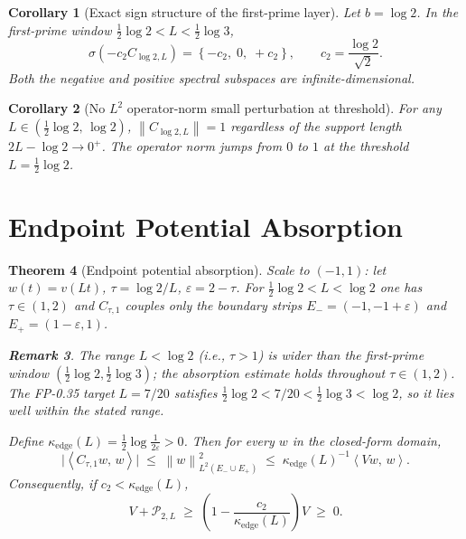 \documentclass[12pt,a4paper]{amsart}
\theoremstyle{plain}
\newtheorem{theorem}{Theorem}[section]
\newtheorem{corollary}[theorem]{Corollary}
\theoremstyle{definition}
\newtheorem{remark}[theorem]{Remark}
\newcommand{\Ctau}{C_{\tau,1}}
\newcommand{\ctwo}{c_2}              %
\newcommand{\kappae}{\kappa_{\mathrm{edge}}}
\newcommand{\Eminus}{E_-}
\newcommand{\Eplus}{E_+}
\newcommand{\norm}[1]{\left\|#1\right\|}
\newcommand{\ip}[2]{\left\langle #1,\, #2\right\rangle}
\begin{document}
\begin{corollary}[Exact sign structure of the first-prime layer]
\label{cor:first-prime}
Let $b = \log 2$.
In the first-prime window $\tfrac{1}{2}\log 2 < L < \tfrac{1}{2}\log 3$,
\[
  \sigma\!\left(-\ctwo C_{\log 2,L}\right)
  = \left\{-\ctwo,\; 0,\; +\ctwo\right\},
  \qquad \ctwo = \frac{\log 2}{\sqrt 2}.
\]
Both the negative and positive spectral subspaces are infinite-dimensional.
\end{corollary}

\begin{corollary}[No $L^2$ operator-norm small perturbation at threshold]
\label{thm:no-small-pert}
For any $L \in (\tfrac{1}{2}\log 2,\, \log 2)$,
$\norm{C_{\log 2,L}} = 1$
regardless of the support length $2L - \log 2 \to 0^+$.
The operator norm jumps from $0$ to $1$ at the threshold
$L = \tfrac{1}{2}\log 2$.
\end{corollary}

\section{Endpoint Potential Absorption}
\label{sec:absorption}

\begin{theorem}[Endpoint potential absorption]
\label{thm:absorption}
Scale to $(-1,1)$: let $w(t) = v(Lt)$, $\tau = \log 2/L$,
$\varepsilon = 2 - \tau$.
For $\tfrac{1}{2}\log 2 < L < \log 2$ one has $\tau \in (1,2)$ and
$\Ctau$ couples only the boundary strips
$\Eminus = (-1,-1+\varepsilon)$ and $\Eplus = (1-\varepsilon,1)$.
\begin{remark}
The range $L < \log 2$ (i.e., $\tau > 1$) is wider than the first-prime
window $(\tfrac12\log 2, \tfrac12\log 3)$; the absorption estimate holds
throughout $\tau\in(1,2)$. The FP-0.35 target $L = 7/20$ satisfies
$\tfrac12\log 2 < 7/20 < \tfrac12\log 3 < \log 2$, so it lies well within
the stated range.
\end{remark}
Define $\kappae(L) = \tfrac{1}{2}\log\!\tfrac{1}{2\varepsilon} > 0$.
Then for every $w$ in the closed-form domain,
\begin{equation}\label{eq:absorption}
  \bigl|\ip{\Ctau w}{w}\bigr|
  \;\le\; \norm{w}_{L^2(\Eminus \cup \Eplus)}^2
  \;\le\; \kappae(L)^{-1}\ip{Vw}{w}.
\end{equation}
Consequently, if $\ctwo < \kappae(L)$,
\[
  V + \mathcal{P}_{2,L}
  \;\ge\; \left(1 - \frac{\ctwo}{\kappae(L)}\right) V \;\ge\; 0.
\]
\end{theorem}
\end{document}
